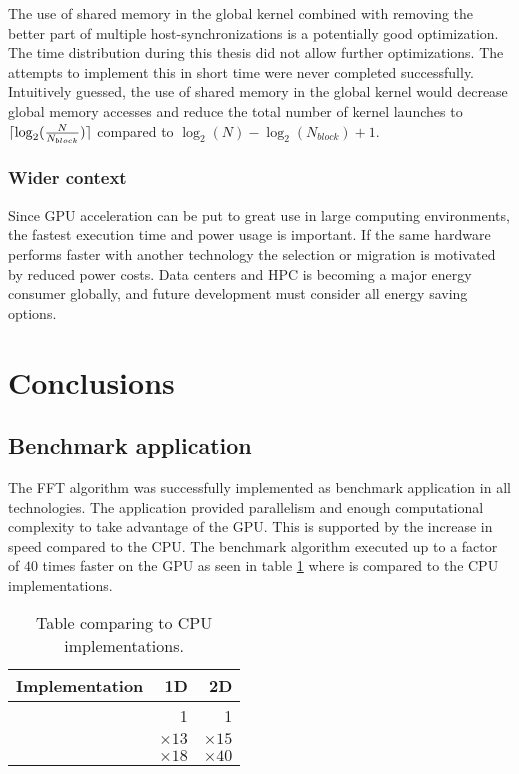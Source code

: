 The use of shared memory in the global \gls{kernel} combined with removing the better part of multiple host-synchronizations is a potentially good optimization. The time distribution during this thesis did not allow further optimizations. The attempts to implement this in short time were never completed successfully. Intuitively guessed, the use of shared memory in the global kernel would decrease global memory accesses and reduce the total number of kernel launches to $\lceil\log_{2}(\frac{N}{N_{block}})\rceil$ compared to $\log_{2}(N) - \log_{2}(N_{block}) + 1$.

\subsubsection{Wider context}

Since \gls{GPU} acceleration can be put to great use in large computing environments, the fastest execution time and power usage is important. If the same hardware performs faster with another technology the selection or migration is motivated by reduced power costs. Data centers and \gls{HPC} is becoming a major energy consumer globally, and future development must consider all energy saving options.

\section{Conclusions}

\subsection{Benchmark application}

The \gls{FFT} algorithm was successfully implemented as benchmark application in all technologies. The application provided parallelism and enough computational complexity to take advantage of the \gls{GPU}. This is supported by the increase in speed compared to the \gls{CPU}. The benchmark algorithm executed up to a factor of $40$ times faster on the GPU as seen in table \ref{tab:cu-vs-cpu} where {\CU} is compared to the CPU implementations.

\begin{table}
	\centering	
	\begin{tabular}{|l|r|r|}
		\hline
		Implementation & 1D & 2D \\ \hline
		{\CU} & 1 & 1 \\ \hline
		{\OMP} & ${\times}13$ & ${\times}15$ \\ \hline
		{\CPP} & ${\times}18$ & ${\times}40$ \\ \hline
	\end{tabular}
	\caption{Table comparing {\CU} to CPU implementations.}
	\label{tab:cu-vs-cpu}
\end{table}

